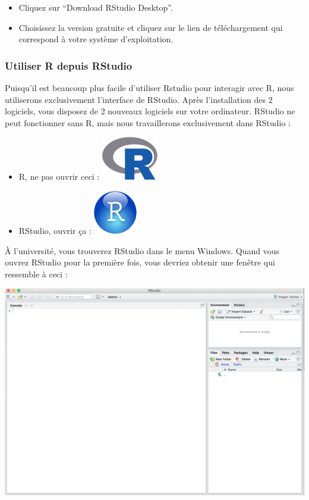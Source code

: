 \documentclass[a4paperpaper,]{article}
\providecommand{\tightlist}{%
  \setlength{\itemsep}{0pt}\setlength{\parskip}{0pt}}
\begin{document}
\begin{itemize}
\tightlist
\item
  Cliquez sur ``Download RStudio Desktop''.
\item
  Choisissez la version gratuite et cliquez sur le lien de téléchargement qui correspond à votre système d'exploitation.
\end{itemize}

\hypertarget{utiliser-r-depuis-rstudio}{%
\subsubsection{Utiliser R depuis RStudio}\label{utiliser-r-depuis-rstudio}}

Puisqu'il est beaucoup plus facile d'utiliser Rstudio pour interagir avec R, nous utiliserons exclusivement l'interface de RStudio. Après l'installation des 2 logiciels, vous disposez de 2 nouveaux logiciels sur votre ordinateur. RStudio ne peut fonctionner sans R, mais nous travaillerons exclusivement dans RStudio :

\begin{itemize}
\tightlist
\item
  R, ne pas ouvrir ceci : \includegraphics{images/Rlogo.png}
\item
  RStudio, ouvrir ça : \includegraphics{images/RStudio-Ball.png}
\end{itemize}

À l'université, vous trouverez RStudio dans le menu Windows. Quand vous ouvrez RStudio pour la première fois, vous devriez obtenir une fenêtre qui ressemble à ceci :

\includegraphics{images/rstudio.png}
\end{document}
